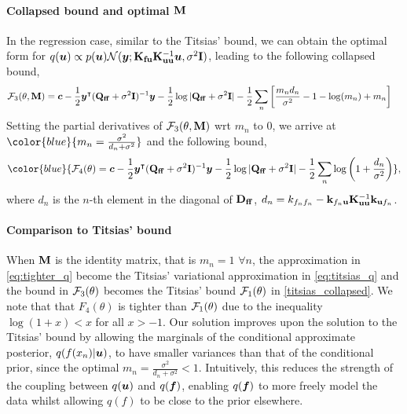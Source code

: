 \paragraph{Collapsed bound and optimal ${\mathbf{M}}$} In the regression case, similar to the Titsias' bound, we can obtain the optimal form for $q({\bm{u}}) \propto p({\bm{u}}) {\mathcal{N}}({\bm{y}}; \mathbf{K}_{\mathbf{fu}}\mathbf{K}_{\mathbf{uu}}^{-1}{\bm{u}}, \sigma^2{\mathbf{I}})$, leading to the following collapsed bound,
\begin{align}
    {\mathcal{F}}_3(\theta, {\mathbf{M}}) 
    &={\bm{c}} - \frac{1}{2} {\bm{y}}^\intercal (\mathbf{Q}_{\mathbf{ff}} + \sigma^2{\mathbf{I}})^{-1} {\bm{y}} - \frac{1}{2} \log |\mathbf{Q}_{\mathbf{ff}} + \sigma^2{\mathbf{I}}| - \frac{1}{2} \sum_n \left[\frac{m_n d_n}{\sigma^2} - 1 - \log(m_n) + m_n\right] \nonumber
\end{align}
Setting the partial derivatives of ${\mathcal{F}}_3(\theta, {\mathbf{M}})$ wrt $m_n$ to 0, we arrive at $\color{blue}{m_n = \frac{\sigma^2}{d_n + \sigma^2}}$ and the following bound,
\begin{align}
    \color{blue}{\gF_4(\theta) =\vc - \frac{1}{2} \vy^\intercal (\qff + \sigma^2\rmI)^{-1} \vy - \frac{1}{2} \log |\qff + \sigma^2\rmI| - \frac{1}{2} \sum_n \log \left( 1+\frac{d_n}{\sigma^2} \right)}, \label{eq:tighter_collapsed}
\end{align}
where $d_n$ is the $n$-th element in the diagonal of $\mathbf{D}_{\mathbf{ff}}$, $d_n = {k}_{f_nf_n} - \mathbf{k}_{f_n\mathbf{u}}\mathbf{K}_{\mathbf{uu}}^{-1}\mathbf{k}_{\mathbf{u}f_n}$.
\paragraph{Comparison to Titsias' bound} When ${\mathbf{M}}$ is the identity matrix, that is $m_n = 1$ $\forall n$, the approximation in \cref{eq:tighter_q} become the Titsias' variational approximation in \cref{eq:titsias_q} and the bound in ${\mathcal{F}}_3(\theta)$ becomes the Titsias' bound ${\mathcal{F}}_1(\theta)$ in \cref{titsias_collapsed}. We note that that $F_4(\theta)$ is tighter than ${\mathcal{F}}_1(\theta)$ due to the inequality $\log(1 + x) < x$ for all $x > -1$. Our solution improves upon the solution to the Titsias' bound by allowing the marginals of the conditional approximate posterior, $q(f(x_n) | {\bm{u}})$, to have smaller variances than that of the conditional prior, since the optimal $m_n = \frac{\sigma^2}{d_n + \sigma^2} < 1$. Intuitively, this reduces the strength of the coupling between $q({\bm{u}})$ and $q({\bm{f}})$, enabling $q({\bm{f}})$ to more freely model the data whilst allowing $q(f)$ to be close to the prior elsewhere.


